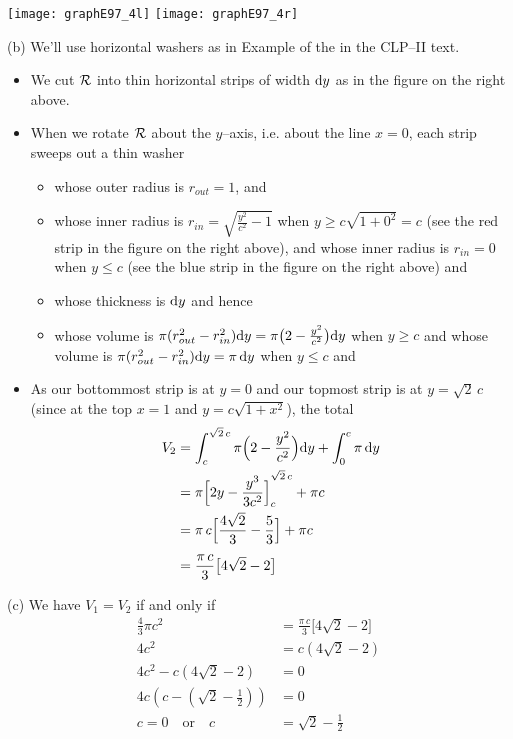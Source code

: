 \begin{solution}
\begin{center}
       \texttt{[image: graphE97\_4l]}\qquad\qquad
       \texttt{[image: graphE97\_4r]}
\end{center}


\noindent (b)
We'll use horizontal washers as in Example  
of the %
 in the CLP--II text.
 \begin{itemize}
\item We cut $\mathcal{R}$ into thin horizontal  strips of width $\mathrm{d}y$ as in
the figure on the right above.

\item When we rotate $\mathcal{R}$ about the $y$--axis, i.e. about the line $x=0$, each strip
sweeps out a thin washer
\begin{itemize}
\item
whose outer radius is $r_{out}=1$, and
\item
whose inner radius is $r_{in}= \sqrt{\frac{y^2}{c^2}-1}$ when $y\ge c\sqrt{1+0^2}=c$
(see the red strip in the figure on the right above),  and
whose inner radius is $r_{in}= 0$ when $y\le c$
(see the blue strip in the figure on the right above) and
\item
whose thickness is $\mathrm{d}y$ and hence
\item
whose volume is
$\pi(r_{out}^2 - r_{in}^2)\mathrm{d}y = \pi\big(2-\frac{y^2}{c^2}\big)\mathrm{d}y$
when $y\ge c$ and  whose volume is
$\pi(r_{out}^2 - r_{in}^2)\mathrm{d}y = \pi\,\mathrm{d}y$
when $y\le c$ and

\end{itemize}
\item As our bottommost strip is at $y=0$ and our topmost
strip is at $y=\sqrt{2}\,c$ (since at the top $x=1$ and $y= c\sqrt{1+x^2}$), the total
\begin{align*}
V_2
&= \int _c^{\sqrt{2}\,c}  \pi\Big(2-\frac{y^2}{c^2}\Big)\mathrm{d}y
+\int _ 0^c \pi\,\mathrm{d}y \\
&=\pi{\Big[2y -\frac{y^3}{3c^2}\Big]}_c^{\sqrt{2}\,c} +\pi c\\
&=\pi\,c\Big[\frac{4\sqrt{2}}{3}-\frac{5}{3} \Big]+\pi c \\[0.05in]
&=\frac{\pi\,c}{3}\big[4\sqrt{2}-2 \big]
\end{align*}
\end{itemize}

\noindent (c)
We have $V_1=V_2$ if and only if
\begin{align*}
\frac{4}{3}\pi c^2&=\frac{\pi\,c}{3}\big[4\sqrt{2}-2 \big]  \\
4c^2&=c\left(4\sqrt{2}-2\right)\\
4c^2-c\left(4\sqrt{2}-2\right)&=0\\
4c\left(c - \left(\sqrt{2}-\frac{1}{2}\right)\right)&=0\\
c=0 \quad\mbox{or}\quad c&=\sqrt{2}-\frac{1}{2}
\end{align*}


\end{solution}

